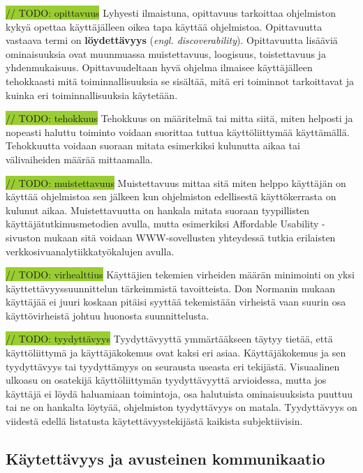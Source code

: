 \documentclass[utf8]{gradu3}
\begin{document}
\colorbox{YellowGreen}{// TODO: opittavuus}
Lyhyesti ilmaistuna, opittavuus tarkoittaa ohjelmiston kykyä opettaa käyttäjälleen oikea tapa käyttää ohjelmistoa. Opittavuutta vastaava termi on \textbf{löydettävyys} (\textit{engl. discoverability}). Opittavuutta lisääviä ominaisuuksia ovat muunmuassa muistettavuus, loogisuus, toistettavuus ja yhdenmukaisuus. Opittavuudeltaan hyvä ohjelma ilmaisee käyttäjälleen tehokkaasti mitä toiminnallisuuksia se sisältää, mitä eri toiminnot tarkoittavat ja kuinka eri toiminnallisuuksia käytetään. \parencite[]{improving-learnability}

\colorbox{YellowGreen}{// TODO: tehokkuus}
Tehokkuus on määritelmä tai mitta siitä, miten helposti ja nopeasti haluttu toiminto voidaan suorittaa tuttua käyttöliittymää käyttämällä. Tehokkuutta voidaan suoraan mitata esimerkiksi kulunutta aikaa tai välivaiheiden määrää mittaamalla. 

\colorbox{YellowGreen}{// TODO: muistettavuus}
Muistettavuus mittaa sitä miten helppo käyttäjän on käyttää ohjelmistoa sen jälkeen kun ohjelmiston edellisestä käyttökerrasta on kulunut aikaa. Muistettavuutta on hankala mitata suoraan tyypillisten käyttäjätutkimusmetodien avulla, mutta esimerkiksi Affordable Usability -sivuston \parencite[]{affordable-usability} mukaan sitä voidaan WWW-sovellusten yhteydessä tutkia erilaisten verkkosivuanalytiikkatyökalujen avulla.

\colorbox{YellowGreen}{// TODO: virhealttius}
Käyttäjien tekemien virheiden määrän minimointi on yksi käyttettävyyssuunnittelun tärkeimmistä tavoitteista. Don Normanin mukaan \parencite[]{norman-doet} käyttäjää ei juuri koskaan pitäisi syyttää tekemistään virheistä vaan suurin osa käyttövirheistä johtuu huonosta suunnittelusta.

\colorbox{YellowGreen}{// TODO: tyydyttävyys}
Tyydyttävyyttä ymmärtääkseen täytyy tietää, että käyttöliittymä ja käyttäjäkokemus ovat kaksi eri asiaa. Käyttäjäkokemus ja sen tyydyttävyys tai tyydyttämyys on seurausta useasta eri tekijästä. Visuaalinen ulkoasu on osatekijä käyttöliittymän tyydyttävyyttä arvioidessa, mutta jos käyttäjä ei löydä haluamiaan toimintoja, osa halutuista ominaisuuksista puuttuu tai ne on hankalta löytyää, ohjelmiston tyydyttävyys on matala. Tyydyttävyys on viidestä edellä listatusta käytettävyystekijästä kaikista subjektiivisin.

\subsection{Käytettävyys ja avusteinen kommunikaatio}
\end{document}
